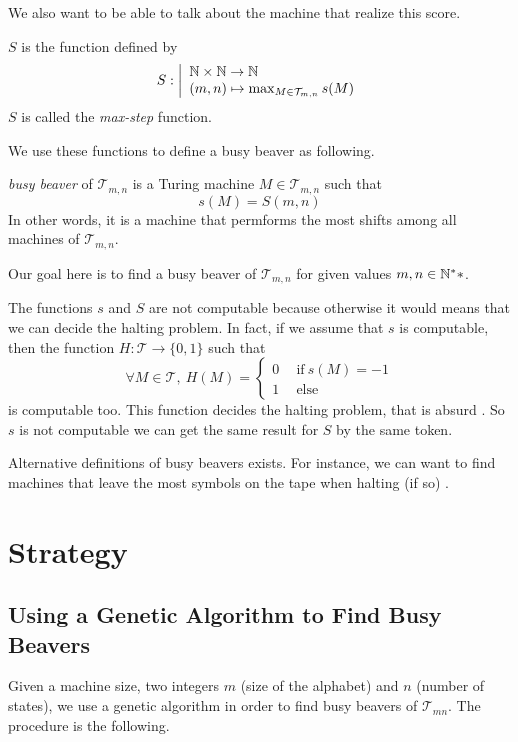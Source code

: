 \documentclass{report}
\begin{document}
We also want to be able to talk about the machine that realize this score.
\begin{Def}
$S$ is the function defined by
\[
S : \left |
  \begin{array}{l}
    \mathbb{N} \times \mathbb{N} \to \mathbb{N}\\
    (m,n) \mapsto \max_{M \in \mathcal{T}_{m,n}} s(M)
  \end{array}
\right .
\]
$S$ is called the \emph{max-step} function.
\end{Def}

We use these functions to define a busy beaver as following.

\begin{Def}
\emph{busy beaver} of $\mathcal{T}_{m,n}$ is a Turing machine $M \in \mathcal{T}_{m,n}$ such that \[s(M) = S(m,n)\] In other words, it is a machine that permforms the most shifts among all machines of $\mathcal{T}_{m,n}$. 
\end{Def}


Our goal here is to find a busy beaver of $\mathcal{T}_{m,n}$ for given values $m,n\in\mathbb{N}^**$.


\begin{Rem}
  The functions $s$ and $S$ are not computable because otherwise it would means that we can decide the halting problem. In fact, if we assume that $s$ is computable, then the function $H : \mathcal{T} \to \{0,1\}$ such that
  \[
  \forall M \in \mathcal{T},\ H(M) =
  \left \{
    \begin{array}{l}
      0\quad \ \text{if}\ s(M) = -1\\
      1\quad \ \text{else}
    \end{array}
  \right .
  \]
  is computable too. This function decides the halting problem, that is absurd \cite{turing}. So $s$ is not computable we can get the same result for $S$ by the same token.
\end{Rem}

\begin{Rem}
  Alternative definitions of busy beavers exists. For instance, we can want to find machines that leave the most symbols on the tape when halting (if so) \cite{rado}.
\end{Rem}

\chapter{Strategy}
\label{chap:strategy}

\section{Using a Genetic Algorithm to Find Busy Beavers}
\label{sec:genalg}
Given a machine size, \ie two integers $m$ (size of the alphabet) and $n$ (number of states), we use a genetic algorithm in order to find busy beavers of $\mathcal{T}_{mn}$. The procedure is the following.
\end{document}
